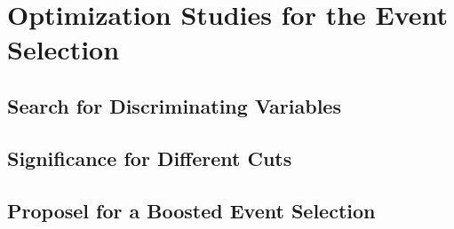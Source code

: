 \chapter{Optimization Studies for the Event Selection}

\section{Search for Discriminating Variables }

\section{Significance for Different Cuts}

\section{Proposel for a Boosted Event Selection}

